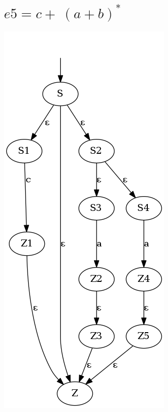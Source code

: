 \documentclass{article}
\begin{document}
\section{$e5 = c +\ (a + b)^{*} $}
\includegraphics[scale=0.5]{e5.png}
\end{document}
